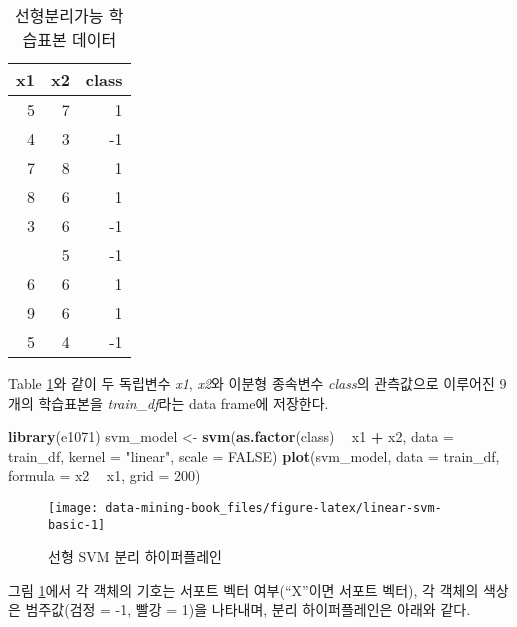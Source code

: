 \documentclass[]{book}
\newenvironment{Shaded}{\begin{snugshade}}{\end{snugshade}}
\newcommand{\DataTypeTok}[1]{\textcolor[rgb]{0.13,0.29,0.53}{#1}}
\newcommand{\DecValTok}[1]{\textcolor[rgb]{0.00,0.00,0.81}{#1}}
\newcommand{\KeywordTok}[1]{\textcolor[rgb]{0.13,0.29,0.53}{\textbf{#1}}}
\newcommand{\NormalTok}[1]{#1}
\newcommand{\OperatorTok}[1]{\textcolor[rgb]{0.81,0.36,0.00}{\textbf{#1}}}
\newcommand{\OtherTok}[1]{\textcolor[rgb]{0.56,0.35,0.01}{#1}}
\newcommand{\StringTok}[1]{\textcolor[rgb]{0.31,0.60,0.02}{#1}}
\begin{document}
\begin{table}[t]

\caption{\label{tab:svm-train-data-table}선형분리가능 학습표본 데이터}
\centering
\begin{tabular}{rrr}
\toprule
x1 & x2 & class\\
\midrule
5 & 7 & 1\\
4 & 3 & -1\\
7 & 8 & 1\\
8 & 6 & 1\\
3 & 6 & -1\\
\addlinespace
2 & 5 & -1\\
6 & 6 & 1\\
9 & 6 & 1\\
5 & 4 & -1\\
\bottomrule
\end{tabular}
\end{table}

Table \ref{tab:svm-train-data-table}와 같이 두 독립변수 \emph{x1}, \emph{x2}와 이분형 종속변수 \emph{class}의 관측값으로 이루어진 9개의 학습표본을 \emph{train\_df}라는 data frame에 저장한다.

\begin{Shaded}
\begin{Highlighting}[]
\KeywordTok{library}\NormalTok{(e1071)}
\NormalTok{svm_model <-}\StringTok{ }\KeywordTok{svm}\NormalTok{(}\KeywordTok{as.factor}\NormalTok{(class) }\OperatorTok{~}\StringTok{ }\NormalTok{x1 }\OperatorTok{+}\StringTok{ }\NormalTok{x2, }\DataTypeTok{data =}\NormalTok{ train_df, }\DataTypeTok{kernel =} \StringTok{"linear"}\NormalTok{, }\DataTypeTok{scale =} \OtherTok{FALSE}\NormalTok{)}
\KeywordTok{plot}\NormalTok{(svm_model, }\DataTypeTok{data =}\NormalTok{ train_df, }\DataTypeTok{formula =}\NormalTok{ x2 }\OperatorTok{~}\StringTok{ }\NormalTok{x1, }\DataTypeTok{grid =} \DecValTok{200}\NormalTok{)}
\end{Highlighting}
\end{Shaded}

\begin{figure}

{\centering \texttt{[image: data-mining-book\_files/figure-latex/linear-svm-basic-1]} 

}

\caption{선형 SVM 분리 하이퍼플레인}\label{fig:linear-svm-basic}
\end{figure}

그림 \ref{fig:linear-svm-basic}에서 각 객체의 기호는 서포트 벡터 여부(``X''이면 서포트 벡터), 각 객체의 색상은 범주값(검정 = -1, 빨강 = 1)을 나타내며, 분리 하이퍼플레인은 아래와 같다.
\end{document}
